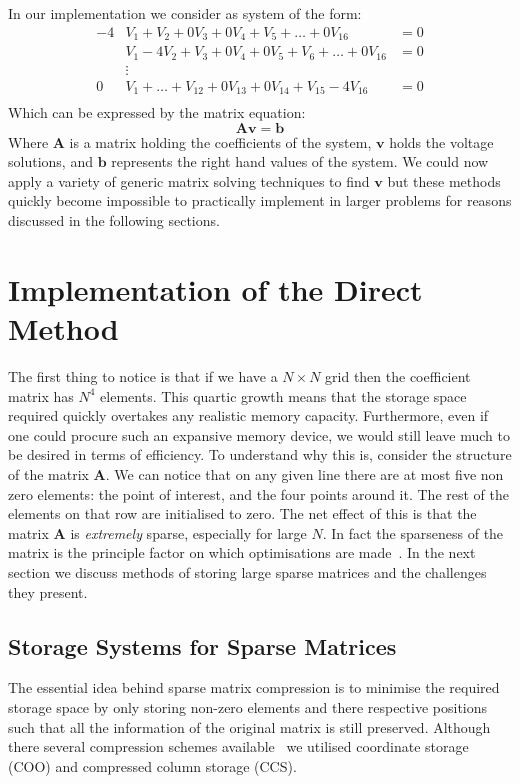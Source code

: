 \documentclass[a4paper]{article}
\newcommand{\mat}[1]{\mathbf{#1}}
\renewcommand{\vec}[1]{\bm{#1}}
\begin{document}
In our implementation we consider as system of the form:
\begin{align*}
	-4&V_1+V_2+0V_3+0V_4+V_5+\dots+0V_{16}&=0\\
	&V_1-4V_2+V_3+0V_4+0V_5+V_6+\dots+0V_{16}&=0\\
	&\vdots\\
	0&V_1+\dots+V_{12}+0V_{13}+0V_{14}+V_{15}-4V_{16}&=0\\
\end{align*}
Which can be expressed by the matrix equation:
\begin{equation}
	\mat{A}\vec{v}=\vec{b}
	\label{matEq}
\end{equation}
Where $\mat{A}$ is a matrix holding the coefficients of the system, $\vec{v}$
holds the voltage solutions, and $\vec{b}$ represents the right hand values of
the system. We could now apply a variety of generic matrix solving techniques
to find $\vec{v}$ but these methods quickly become impossible to practically
implement in larger problems for reasons discussed in the following sections.

\section{Implementation of the Direct Method}
The first thing to notice is that if we have a $N\times N$ grid then the
coefficient matrix has $N^4$ elements. This quartic growth means that the
storage space required quickly overtakes any realistic memory capacity.
Furthermore, even if one could procure such an expansive memory device, we
would still leave much to be desired in terms of efficiency. To understand why
this is, consider the structure of the matrix $\mat{A}$. We can notice that on
any given line there are at most five non zero elements: the point of interest,
and the four points around it. The rest of the elements on that row are
initialised to zero. The net effect of this is that the matrix $\mat{A}$ is
\emph{extremely} sparse, especially for large $N$. In fact the sparseness of
the matrix is the principle factor on which optimisations are made~\cite{NR}.
In the next section we discuss methods of storing large sparse matrices and the
challenges they present.

\subsection{Storage Systems for Sparse Matrices}
The essential idea behind sparse matrix compression is to minimise the required
storage space by only storing non-zero elements and there respective positions
such that all the information of the original matrix is still preserved.
Although there several compression schemes available~\cite{101matstore} we
utilised coordinate storage (COO) and compressed column storage (CCS).
\end{document}
